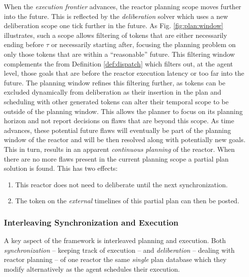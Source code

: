 When the {\em execution frontier} advances, the reactor planning scope
moves further into the future. This is reflected by the {\em
  deliberation} solver which uses a new deliberation scope one tick
further in the future. As Fig. \ref{fig:plan:window} illustrates, such
a scope allows filtering of tokens that are either necessarily ending
before $\tau$ or necessarily starting after, focusing the planning
problem on only those tokens that are within a ``reasonable'' future.
This filtering window complements the  from
Definition \ref{def:dispatch} which filters out, at the agent level,
those goals that are before the reactor execution latency or too far
into the future.  The planning window refines this filtering further,
as tokens can be excluded dynamically from deliberation as their
insertion in the plan and scheduling with other generated tokens can
alter their temporal scope to be outside of the planning window.  This
allows the planner to focus on its planning horizon and not report
decisions on flaws that are beyond this scope. As time advances, these
potential future flaws will eventually be part of the planning window
of the reactor and will be then resolved along with potentially new
goals.  This in turn, results in an apparent \emph{continuous
  planning}  of the reactor. When there are
no more flaws present in the current planning scope a partial plan
solution is found. This has two effects:

\begin{enumerate}

\item This reactor does not need to deliberate until the next
  synchronization. 

\item The token on the {\em external} timelines of this partial plan
  can then be posted. 

\end{enumerate}


\subsubsection{Interleaving Synchronization and Execution}
\label{sec:arch:intertwine}

A key aspect of the \rx framework is interleaved planning and
execution. Both {\em synchronization} -- keeping track of execution --
and {\em deliberation} -- dealing with reactor planning -- of one
reactor  the same {\em single} plan database which
they modify alternatively as the \rx agent schedules their execution.

